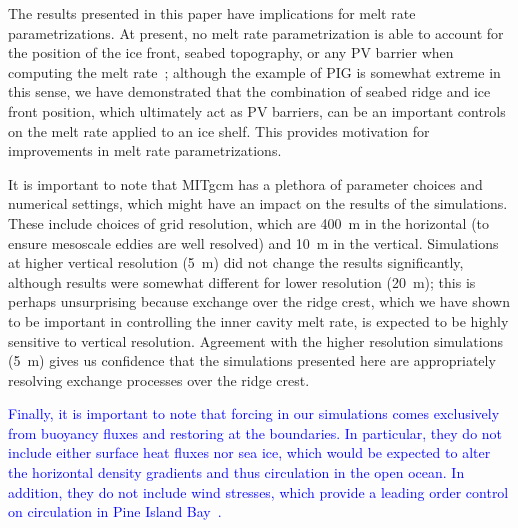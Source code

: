 \documentclass[draft]{agujournal2019}
\newcommand{\blue}[1]{\textcolor{blue}{#1}}
\begin{document}
The results presented in this paper have implications for melt rate parametrizations. At present, no melt rate parametrization is able to account for the position of the ice front, seabed topography, or any PV barrier when computing the melt rate~\cite{AsayDavis2017CurrClimChRep}; although the example of PIG is somewhat extreme in this sense, we have demonstrated that the combination of seabed ridge and ice front position, which ultimately act as PV barriers, can be an important controls on the melt rate applied to an ice shelf. This provides motivation for improvements in melt rate parametrizations. %

It is important to note that MITgcm has a plethora of parameter choices and numerical settings, which might have an impact on the results of the simulations. These include choices of grid resolution, which are 400~m in the horizontal (to ensure mesoscale eddies are well resolved) and 10~m in the vertical. Simulations at higher vertical resolution (5~m) did not change the results significantly, although results were somewhat different for lower resolution (20~m); this is perhaps unsurprising because exchange over the ridge crest, which we have shown to be important in controlling the inner cavity melt rate, is expected to be highly sensitive to vertical resolution. Agreement with the higher resolution simulations (5~m) gives us confidence that the simulations presented here are appropriately resolving exchange processes over the ridge crest. 

\blue{
Finally, it is important to note that forcing in our simulations comes exclusively from buoyancy fluxes and restoring at the boundaries. In particular, they do not include either surface heat fluxes nor sea ice, which would be expected to alter the horizontal density gradients and thus circulation in the open ocean. In addition, they do not include wind stresses, which provide a leading order control on circulation in Pine Island Bay~\cite{Dutrieux2014Science}.}
\end{document}
